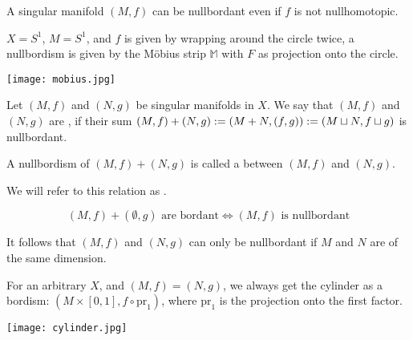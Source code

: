 \documentclass[a4paper,12pt]{article}
\begin{document}
\begin{observation}
    A singular manifold \((M,f)\) can be nullbordant even if \(f\) is not nullhomotopic.
\end{observation}

\begin{example}
    \(X=S^1\), \(M=S^1\), and \(f\) is given by wrapping around the circle twice, a nullbordism is given by the M\"obius strip \(\mathbb{M}\) with \(F\) as projection onto the circle.\begin{center} \texttt{[image: mobius.jpg]} \end{center}
\end{example}


\begin{definition}\label{bordant}
    Let \((M,f)\) and \((N,g)\) be singular manifolds in \(X\). We say that \((M,f)\) and \((N,g)\) are , if their sum \((M,f)+(N,g):=(M+N, (f,g)):=(M\sqcup N, f\sqcup g)\) is nullbordant.

    A nullbordism of \((M,f)+(N,g)\) is called a  between \((M,f)\) and \((N,g)\).
\end{definition}

We will refer to this relation as .

\begin{remark}
    \[(M,f)+(\emptyset,g) \text{ are bordant} \iff (M,f) \text{ is nullbordant}\]
\end{remark}

\begin{remark}
    It follows that \((M,f)\) and \((N,g)\) can only be nullbordant if \(M\) and \(N\) are of the same dimension.
\end{remark}

\begin{example}[Cylinder]\label{cylinder bordism}
    For an arbitrary \(X\), and \((M,f)=(N,g)\), we always get the cylinder as a bordism: \((M\times[0,1],f\circ\mathrm{pr}_1)\), where \(\mathrm{pr}_1\) is the projection onto the first factor.
    \begin{center}
        \texttt{[image: cylinder.jpg]}
    \end{center}
\end{example}
\end{document}
